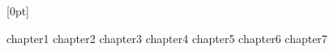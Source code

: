 \documentclass{report}
\begin{document}
$\mathbb{}$



  [0pt]
  {\addvspace{1em}}
  {\bfseries\chaptername\ \thecontentslabel\quad}
  {}
  {\bfseries\hfill\contentspage}
\tableofcontents

\newpage

\newpage
{}
{chapter1}
{chapter2}
{chapter3}
{chapter4}
{chapter5}
{chapter6}
{chapter7}
\end{document}
